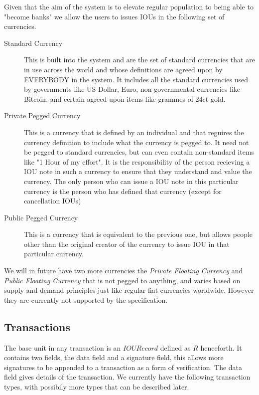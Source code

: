 \documentclass[12pt,a4paper]{article}
\begin{document}
Given that the aim of the system is to elevate regular population to being able to "become banks" we allow the users to issues IOUs in the following set of currencies.

\begin{description}
	\item [Standard Currency] This is built into the system and are the set of standard currencies that are in use across the world and whose definitions are agreed upon by EVERYBODY in the system. It includes all the standard currencies used by governments like US Dollar, Euro, non-governmental currencies like Bitcoin, and certain agreed upon items like grammes of 24ct gold.
	\item[Private Pegged Currency] This is a currency that is defined by an individual and that reguires the currency definition to include what the currency is pegged to. It need not be pegged to standard currencies, but can even contain non-standard items like "1 Hour of my effort". It is the responsibility of the person recieving a IOU note in such a currency to ensure that they understand and value the currency. The only person who can issue a IOU note in this particular currency is the person who has defined that currency (except for cancellation IOUs)
	\item[Public Pegged Currency] This is a currency that is equivalent to the previous one, but allows people other than the original creator of the currency to issue IOU in that particular currency.
\end{description}

We will in future have two more currencies the \emph{Private Floating Currency} and \emph{Public Floating Currency} that is not pegged to anything, and varies based on supply and demand principles just like regular fiat currencies worldwide. However they are currently not supported by the specification.

\subsection{Transactions}
The base unit in any transaction is an $IOU Record$ defined as $R$ henceforth. It contains two fields, the data field and a signature field, this allows more signatures to be appended to a transaction as a form of verification. The data field gives details of the transaction. We currently have the following transaction types, with possibily more types that can be described later.
\end{document}

